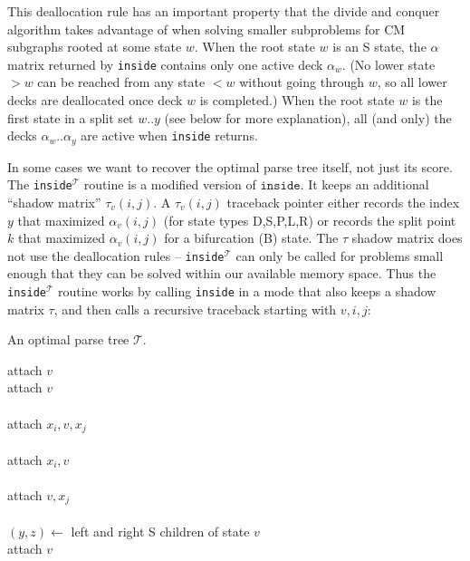 \documentclass[11pt]{article}
\begin{document}
This deallocation rule has an important property that the divide and
conquer algorithm takes advantage of when solving smaller subproblems
for CM subgraphs rooted at some state $w$.  When the root state $w$ is
an S state, the $\alpha$ matrix returned by \texttt{inside} contains
only one active deck $\alpha_w$. (No lower state $>w$ can be reached
from any state $<w$ without going through $w$, so all lower decks are
deallocated once deck $w$ is completed.) When the root state $w$ is
the first state in a split set $w..y$ (see below for more
explanation), all (and only) the decks $\alpha_w..\alpha_y$ are active
when \texttt{inside} returns.

In some cases we want to recover the optimal parse tree itself, not
just its score. The \texttt{inside}$^{\mathcal{T}}$ routine is a
modified version of $\texttt{inside}$. It keeps an additional ``shadow
matrix'' $\tau_v(i,j)$. A $\tau_v(i,j)$ traceback pointer either
records the index $y$ that maximized $\alpha_v(i,j)$ (for state types
D,S,P,L,R) or records the split point $k$ that maximized
$\alpha_v(i,j)$ for a bifurcation (B) state. The $\tau$ shadow matrix
does not use the deallocation rules -- \texttt{inside}$^{\mathcal{T}}$
can only be called for problems small enough that they can be solved
within our available memory space. Thus the
\texttt{inside}$^{\mathcal{T}}$ routine works by calling
\texttt{inside} in a mode that also keeps a shadow matrix $\tau$,
and then calls a recursive traceback starting with $v,i,j$:

\begin{algorithm}
         {An optimal parse tree $\mathcal{T}$.}
\begin{algtab*}
    attach $v$\\
    attach $v$ \\
    \\
    attach $x_i,v,x_j$\\
    \\
    attach $x_i,v$\\
    \\
    attach $v,x_j$\\
    \\
    $(y,z) \leftarrow $ left and right S children of state $v$\\
    attach $v$\\
    \\
    \\
\algend
\end{algtab*}
\end{algorithm}
\end{document}
